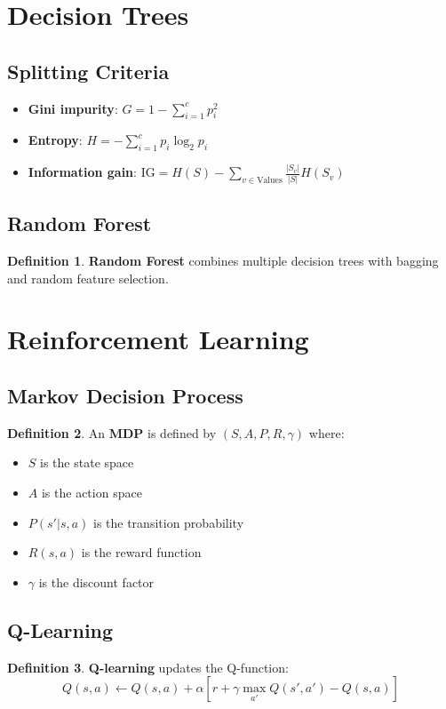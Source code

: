 \documentclass[11pt]{article}
\theoremstyle{definition}
\newtheorem{definition}{Definition}[section]
\begin{document}
\section{Decision Trees}

\subsection{Splitting Criteria}
\begin{itemize}
    \item \textbf{Gini impurity}: $G = 1 - \sum_{i=1}^c p_i^2$
    \item \textbf{Entropy}: $H = -\sum_{i=1}^c p_i \log_2 p_i$
    \item \textbf{Information gain}: $\text{IG} = H(S) - \sum_{v \in \text{Values}} \frac{|S_v|}{|S|} H(S_v)$
\end{itemize}

\subsection{Random Forest}
\begin{definition}
\textbf{Random Forest} combines multiple decision trees with bagging and random feature selection.
\end{definition}

\section{Reinforcement Learning}

\subsection{Markov Decision Process}
\begin{definition}
An \textbf{MDP} is defined by $(S, A, P, R, \gamma)$ where:
\begin{itemize}
    \item $S$ is the state space
    \item $A$ is the action space
    \item $P(s'|s,a)$ is the transition probability
    \item $R(s,a)$ is the reward function
    \item $\gamma$ is the discount factor
\end{itemize}
\end{definition}

\subsection{Q-Learning}
\begin{definition}
\textbf{Q-learning} updates the Q-function:
$$Q(s,a) \leftarrow Q(s,a) + \alpha[r + \gamma \max_{a'} Q(s',a') - Q(s,a)]$$
\end{definition}
\end{document}
